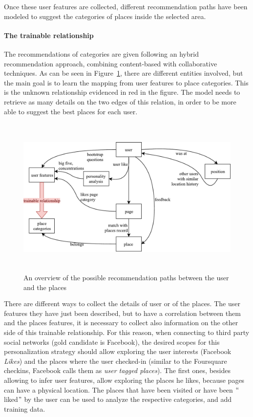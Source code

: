 Once these user features are collected, different recommendation paths have been modeled to suggest the categories of places inside the selected area.

\paragraph{The trainable relationship}
The recommendations of categories are given following an hybrid recommendation approach, combining content-based with collaborative techniques. As can be seen in Figure~\ref{fig:recommendationPaths}, there are different entities involved, but the main goal is to learn the mapping from user features to place categories. This is the unknown relationship evidenced in red in the figure. The model needs to retrieve as many details on the two edges of this relation, in order to be more able to suggest the best places for each user.


\begin{figure}[!htbp]
    \centering
    \includegraphics[max width=\linewidth,max height=8cm,keepaspectratio]{figures/recommendationPaths}
    \caption{An overview of the possible recommendation paths between the user and the places}\label{fig:recommendationPaths}
\end{figure}

There are different ways to collect the details of user or of the places. The user features they have just been described, but to have a correlation between them and the places features, it is necessary to collect also information on the other side of this trainable relationship. For this reason, when connecting to third party social networks (gold candidate is Facebook), the desired scopes for this personalization strategy should allow exploring the user interests (Facebook \textit{Likes}) and the places where the user checked-in (similar to the Foursquare checkins, Facebook calls them as \textit{user tagged places}). The first ones, besides allowing to infer user features, allow exploring the places he likes, because pages can have a physical location. The places that have been visited or have been $``$liked$"$  by the user can be used to analyze the respective categories, and add training data.

